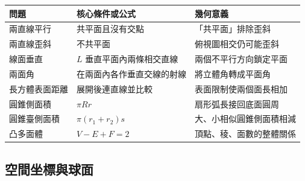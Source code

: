 \documentclass[11pt,a4paper]{article}
\newcounter{none}
\begin{document}
{\def\LTcaptype{none} %
\begin{longtable}[]{@{}lll@{}}
\toprule\noalign{}
問題 & 核心條件或公式 & 幾何意義 \\
\midrule\noalign{}
\endhead
\bottomrule\noalign{}
\endlastfoot
兩直線平行 & 共平面且沒有交點 & 「共平面」排除歪斜 \\
兩直線歪斜 & 不共平面 & 俯視圖相交仍可能歪斜 \\
線面垂直 & \(L\) 垂直平面內兩條相交直線 & 兩個不平行方向鎖定平面 \\
兩面角 & 在兩面內各作垂直交線的射線 & 將立體角轉成平面角 \\
長方體表面距離 & 展開後連直線並比較 & 表面限制使兩個面長相加 \\
圓錐側面積 & \(\pi Rr\) & 扇形弧長接回底面圓周 \\
圓錐臺側面積 & \(\pi(r_1+r_2)s\) & 大、小相似圓錐側面積相減 \\
凸多面體 & \(V-E+F=2\) & 頂點、稜、面數的整體關係 \\
\end{longtable}
}

\subsection{空間坐標與球面}\label{ux7a7aux9593ux5750ux6a19ux8207ux7403ux9762}
\end{document}

